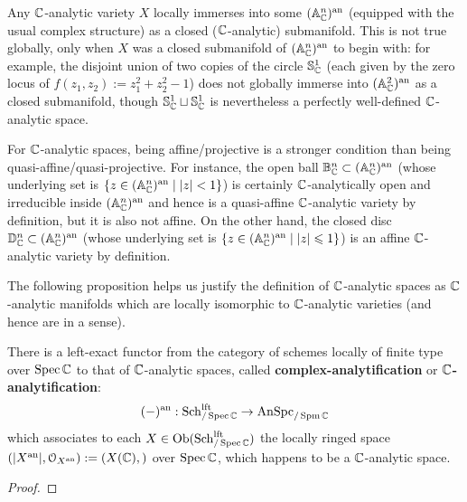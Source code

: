            \begin{example}
                Any $\mathbb{C}$-analytic variety $X$ locally immerses into some $(\mathbb{A}^n_{\mathbb{C}})^{\mathrm{an}}$ (equipped with the usual complex structure) as a closed ($\mathbb{C}$-analytic) submanifold. This is not true globally, only when $X$ was a closed submanifold of $(\mathbb{A}^n_{\mathbb{C}})^{\mathrm{an}}$ to begin with: for example, the disjoint union of two copies of the circle $\mathbb{S}^1_{\mathbb{C}}$ (each given by the zero locus of $f(z_1, z_2) := z_1^2 + z_2^2 - 1$) does not globally immerse into $(\mathbb{A}^2_{\mathbb{C}})^{\mathrm{an}}$ as a closed submanifold, though $\mathbb{S}^1_{\mathbb{C}} \sqcup \mathbb{S}^1_{\mathbb{C}}$ is nevertheless a perfectly well-defined $\mathbb{C}$-analytic space. 
            \end{example}
            \begin{example}
                For $\mathbb{C}$-analytic spaces, being affine/projective is a stronger condition than being quasi-affine/quasi-projective. For instance, the open ball $\mathbb{B}^n_{\mathbb{C}} \subset (\mathbb{A}^n_{\mathbb{C}})^{\mathrm{an}}$ (whose underlying set is $\{z \in (\mathbb{A}^n_{\mathbb{C}})^{\mathrm{an}} \mid |z| < 1\}$) is certainly $\mathbb{C}$-analytically open and irreducible inside $(\mathbb{A}^n_{\mathbb{C}})^{\mathrm{an}}$ and hence is a quasi-affine $\mathbb{C}$-analytic variety by definition, but it is also not affine. On the other hand, the closed disc $\mathbb{D}^n_{\mathbb{C}} \subset (\mathbb{A}^n_{\mathbb{C}})^{\mathrm{an}}$ (whose underlying set is $\{z \in (\mathbb{A}^n_{\mathbb{C}})^{\mathrm{an}} \mid |z| \leqslant 1\}$) is an affine $\mathbb{C}$-analytic variety by definition.
            \end{example}
            
            The following proposition helps us justify the definition of $\mathbb{C}$-analytic spaces as $\mathbb{C}$-analytic manifolds which are locally isomorphic to $\mathbb{C}$-analytic varieties (and hence are  in a sense).
            \begin{proposition} \label{prop: analytification_of_locally_algebraic_complex_schemes}
                There is a left-exact functor from the category of schemes locally of finite type over $\operatorname{Spec} \mathbb{C}$ to that of $\mathbb{C}$-analytic spaces, called \textbf{complex-analytification} or \textbf{$\mathbb{C}$-analytification}:
                    $$(-)^{\mathrm{an}}: \mathrm{Sch}_{/\operatorname{Spec} \mathbb{C}}^{\mathrm{lft}} \to \mathrm{An}\mathrm{Spc}_{/\operatorname{Spm} \mathbb{C}}$$
                which associates to each $X \in \mathrm{Ob}(\mathrm{Sch}_{/\operatorname{Spec} \mathbb{C}}^{\mathrm{lft}})$ the locally ringed space $(|X^{\mathrm{an}}|, \mathcal{O}_{X^{\mathrm{an}}}) := (X(\mathbb{C}), )$ over $\operatorname{Spec} \mathbb{C}$, which happens to be a $\mathbb{C}$-analytic space. 
            \end{proposition}
                \begin{proof}
                        
                \end{proof}
            \begin{corollary}
                
            \end{corollary}
        
